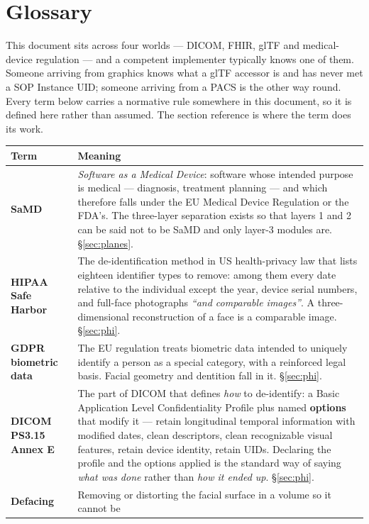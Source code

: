 \documentclass[11pt,a4paper]{article}
\begin{document}
\section{Glossary}\label{app:glossary}

This document sits across four worlds --- DICOM, FHIR, glTF and medical-device regulation
--- and a competent implementer typically knows one of them. Someone arriving from graphics
knows what a glTF accessor is and has never met a SOP Instance UID; someone arriving from a
PACS is the other way round. Every term below carries a normative rule somewhere in this
document, so it is defined here rather than assumed. The section reference is where the
term does its work.

\begin{longtable}{L{4.3cm} L{11.1cm}}
\toprule
\textbf{Term} & \textbf{Meaning}\\
\midrule
\endhead
\textbf{SaMD} & \emph{Software as a Medical Device}: software whose intended purpose is
medical --- diagnosis, treatment planning --- and which therefore falls under the EU
Medical Device Regulation or the FDA's. The three-layer separation exists so that layers 1
and 2 can be said not to be SaMD and only layer-3 modules are. \S\ref{sec:planes}.\\
\textbf{HIPAA Safe Harbor} & The de-identification method in US health-privacy law that
lists eighteen identifier types to remove: among them every date relative to the individual
except the year, device serial numbers, and full-face photographs \emph{``and comparable
images''}. A three-dimensional reconstruction of a face is a comparable image.
\S\ref{sec:phi}.\\
\textbf{GDPR biometric data} & The EU regulation treats biometric data intended to uniquely
identify a person as a special category, with a reinforced legal basis. Facial geometry and
dentition fall in it. \S\ref{sec:phi}.\\
\textbf{DICOM PS3.15 Annex E} & The part of DICOM that defines \emph{how} to de-identify: a
Basic Application Level Confidentiality Profile plus named \textbf{options} that modify it
--- retain longitudinal temporal information with modified dates, clean descriptors, clean
recognizable visual features, retain device identity, retain UIDs. Declaring the profile
and the options applied is the standard way of saying \emph{what was done} rather than
\emph{how it ended up}. \S\ref{sec:phi}.\\
\textbf{Defacing} & Removing or distorting the facial surface in a volume so it cannot be

\end{longtable}
\end{document}
